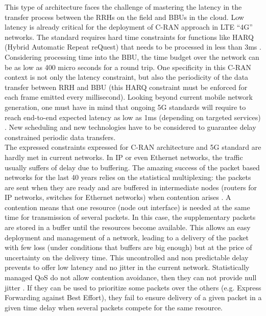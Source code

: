 \documentclass{article}
\begin{document}
 This type of architecture faces the challenge of mastering the latency in the transfer process between the RRHs on the field and BBUs in the cloud.
 Low latency is already critical for the deployment of C-RAN approach in LTE “4G” networks. 
 The standard requires hard time constraints for functions like HARQ (Hybrid Automatic Repeat reQuest) that needs to be processed in less than 3ms \cite{bouguen2012lte}. Considering processing time into the BBU, the time budget over the network can be as low as 400 micro seconds for a round trip. One specificity in this C-RAN context is not only the latency constraint, but also the periodicity of the data transfer between RRH and BBU (this HARQ constraint must be enforced for each frame emitted every millisecond).
 Looking beyond current mobile network generation, one must have in mind that ongoing 5G standards will require to reach end-to-end expected latency as low as 1ms (depending on targeted services) \cite{boccardi2014five}.
 New scheduling  and new technologies have to be considered to guarantee delay constrained periodic data transfers.\\

The expressed constraints expressed for C-RAN architecture and 5G standard are hardly met in current networks. In IP or even Ethernet networks, the traffic usually suffers of delay due to buffering. The amazing success of the packet based networks for the last 40 years relies on the statistical multiplexing: the packets are sent when they are ready and are buffered in intermediate nodes (routers for IP networks, switches for Ethernet networks) when contention arises \cite{venkatramani1994supporting}. A contention means that one resource (node out interface) is needed at the same time for transmission of several packets. In this case, the supplementary packets are stored in a buffer until the resources become available. This allows an easy deployment and management of a network, leading to a delivery of the packet with few loss (under conditions that buffers are big enough) but at the price of uncertainty on the delivery time. This uncontrolled and non predictable delay prevents to offer low latency and no jitter in the current network. 
Statistically managed QoS do not allow contention avoidance, then they can not provide null jitter \cite{khaunte2003technique}. If they can be used to prioritize some packets over the others (e.g. Express Forwarding against Best Effort), they fail to ensure delivery of a given packet in a given time delay when several packets compete for the same resource.\\ 
\end{document}
